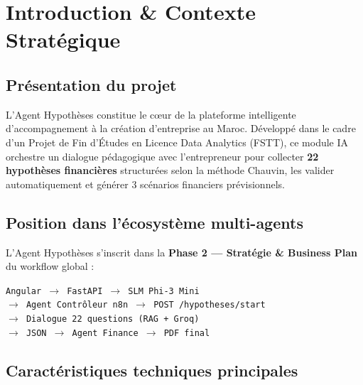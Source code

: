 \documentclass[11pt, a4paper]{article}
\begin{document}
\nopagecolor
\color{black}

\tableofcontents
\newpage

\nopagecolor
\color{black}

\section{Introduction \& Contexte Stratégique}

\subsection{Présentation du projet}

L'Agent Hypothèses constitue le cœur de la plateforme intelligente d'accompagnement à la création d'entreprise au Maroc. Développé dans le cadre d'un Projet de Fin d'Études en Licence Data Analytics (FSTT), ce module IA orchestre un dialogue pédagogique avec l'entrepreneur pour collecter \textbf{22 hypothèses financières} structurées selon la méthode Chauvin, les valider automatiquement et générer 3 scénarios financiers prévisionnels.

\subsection{Position dans l'écosystème multi-agents}

L'Agent Hypothèses s'inscrit dans la \textbf{Phase 2 — Stratégie \& Business Plan} du workflow global :

\begin{formulebox}[title={\bfseries\color{navyblue} Workflow complet}]
\texttt{Angular $\rightarrow$ FastAPI $\rightarrow$ SLM Phi-3 Mini}\\
\texttt{$\rightarrow$ Agent Contrôleur n8n $\rightarrow$ POST /hypotheses/start}\\
\texttt{$\rightarrow$ Dialogue 22 questions (RAG + Groq)}\\
\texttt{$\rightarrow$ JSON $\rightarrow$ Agent Finance $\rightarrow$ PDF final}
\end{formulebox}

\subsection{Caractéristiques techniques principales}
\end{document}
